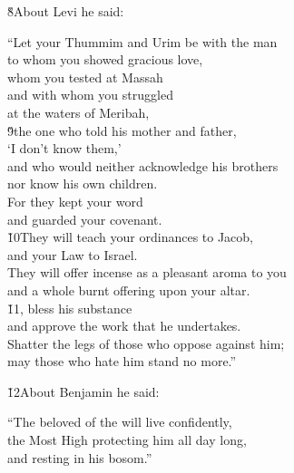 \v{8}About Levi he said:

\begin{poetry}
\poeml ``Let your Thummim and Urim be with the man \\
\poemll    to whom you showed gracious love, \\
\poeml whom you tested at Massah \\
\poemll    and with whom you struggled \\
\poemlll       at the waters of Meribah, \\
\poeml \v{9}the one who told his mother and father, \\
\poemll    `I don't know them,' \\
\poeml and who would neither acknowledge his brothers \\
\poemll    nor know his own children. \\
\poeml For they kept your word \\
\poemll    and guarded your covenant. \\
\poeml \v{10}They will teach your ordinances to Jacob, \\
\poemll    and your Law to Israel. \\
\poeml They will offer incense as a pleasant aroma to you \\
\poemll    and a whole burnt offering upon your altar. \\
\poeml \v{11}, bless his substance \\
\poemll    and approve the work that he undertakes. \\
\poeml Shatter the legs of those who oppose against him; \\
\poemll    may those who hate him stand no more.''
\end{poetry}

\v{12}About Benjamin he said:

\begin{poetry}
\poeml ``The beloved of the  will live confidently, \\
\poemll    the Most High protecting him all day long, \\
\poemlll       and resting in his bosom.''
\end{poetry}

